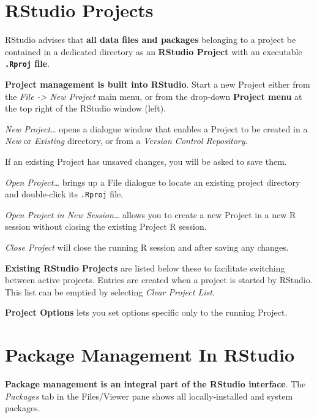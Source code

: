 \documentclass[]{book}
\theoremstyle{definition}
\theoremstyle{definition}
\theoremstyle{definition}
\theoremstyle{remark}
\begin{document}
\hypertarget{rstudio-projects}{%
\section{RStudio Projects}\label{rstudio-projects}}

RStudio advises that \textbf{all data files and packages} belonging to a
project be contained in a dedicated directory as an \textbf{RStudio
Project} with an executable \textbf{\texttt{.Rproj} file}.

\textbf{Project management is built into RStudio}. Start a new Project
either from the \emph{File -\textgreater{} New Project} main menu, or
from the drop-down \textbf{Project menu} at the top right of the RStudio
window (left).

\emph{New Project\ldots{}} opens a dialogue window that enables a
Project to be created in a \emph{New} or \emph{Existing} directory, or
from a \emph{Version Control Repository}.

If an existing Project has unsaved changes, you will be asked to save
them.

\emph{Open Project\ldots{}} brings up a File dialogue to locate an
existing project directory and double-click its \texttt{.Rproj} file.

\emph{Open Project in New Session\ldots{}} allows you to create a new
Project in a new R session without closing the existing Project R
session.

\emph{Close Project} will close the running R session and after saving
any changes.

\textbf{Existing RStudio Projects} are listed below these to facilitate
switching between active projects. Entries are created when a project is
started by RStudio. This list can be emptied by selecting \emph{Clear
Project List}.

\textbf{Project Options} lets you set options specific only to the
running Project.

\hypertarget{package-management-in-rstudio}{%
\section{Package Management In
RStudio}\label{package-management-in-rstudio}}

\textbf{Package management is an integral part of the RStudio
interface}. The \emph{Packages} tab in the Files/Viewer pane shows all
locally-installed and system packages.
\end{document}

